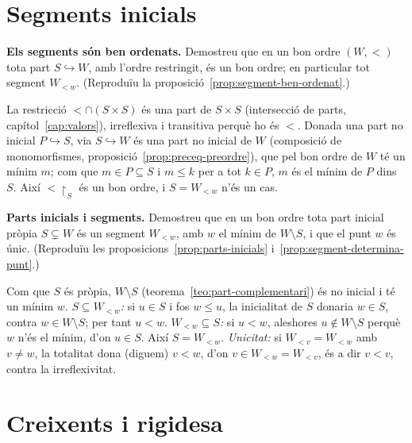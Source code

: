 \section{Segments inicials}\label{prac:segments-bo}

\begin{exercici}
\textbf{Els segments són ben ordenats.} Demostreu que en un bon ordre \((W,<)\) tota part \(S\hookrightarrow W\), amb l'ordre restringit, és un bon ordre; en particular tot segment \(W_{<w}\). (Reproduïu la proposició~\ref{prop:segment-ben-ordenat}.)
\end{exercici}
\begin{solucio}
La restricció \({<}\cap(S\times S)\) és una part de \(S\times S\) (intersecció de parts, capítol~\ref{cap:valors}), irreflexiva i transitiva perquè ho és \({<}\). Donada una part no inicial \(P\hookrightarrow S\), via \(S\hookrightarrow W\) és una part no inicial de \(W\) (composició de monomorfismes, proposició~\ref{prop:preceq-preordre}), que pel bon ordre de \(W\) té un mínim \(m\); com que \(m\in P\subseteq S\) i \(m\le k\) per a tot \(k\in P\), \(m\) és el mínim de \(P\) dins \(S\). Així \({<}\!\restriction_S\) és un bon ordre, i \(S=W_{<w}\) n'és un cas.
\end{solucio}

\begin{exercici}
\textbf{Parts inicials i segments.} Demostreu que en un bon ordre tota part inicial pròpia \(S\subsetneq W\) és un segment \(W_{<w}\), amb \(w\) el mínim de \(W\setminus S\), i que el punt \(w\) és únic. (Reproduïu les proposicions~\ref{prop:parts-inicials} i~\ref{prop:segment-determina-punt}.)
\end{exercici}
\begin{solucio}
Com que \(S\) és pròpia, \(W\setminus S\) (teorema~\ref{teo:part-complementari}) és no inicial i té un mínim \(w\). \emph{\(S\subseteq W_{<w}\):} si \(u\in S\) i fos \(w\le u\), la inicialitat de \(S\) donaria \(w\in S\), contra \(w\in W\setminus S\); per tant \(u<w\). \emph{\(W_{<w}\subseteq S\):} si \(u<w\), aleshores \(u\notin W\setminus S\) perquè \(w\) n'és el mínim, d'on \(u\in S\). Així \(S=W_{<w}\). \emph{Unicitat:} si \(W_{<v}=W_{<w}\) amb \(v\ne w\), la totalitat dona (diguem) \(v<w\), d'on \(v\in W_{<w}=W_{<v}\), és a dir \(v<v\), contra la irreflexivitat.
\end{solucio}

\section{Creixents i rigidesa}\label{prac:rigidesa}

